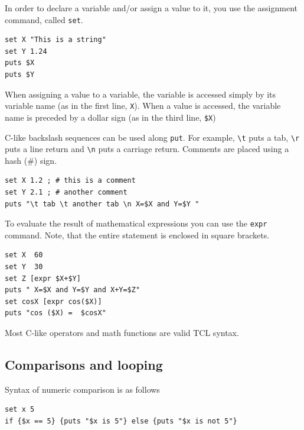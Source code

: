 \documentclass[
paper=a4,                       %
fontsize=11pt,                  %
twoside,                        %
footsepline,                    %
headsepline,                    %
headinclude=false,              %
footinclude=false,              %
pagesize,                       %
]{scrartcl}
\begin{document}
\noindent In order to declare a variable and/or assign a value to it, you use the
assignment command, called \lstinline|set|.

{\small\vspace{0,2cm}
\begin{lstlisting}[numbers=none]
set X "This is a string"
set Y 1.24
puts $X
puts $Y
\end{lstlisting}\vspace{0,2cm}
} 

\noindent When assigning a value to a variable, the variable is accessed simply by its
variable name (as in the first line, \texttt{X}). When a value is accessed, the variable
name is preceded by a dollar sign (as in the third line, \texttt{\$X})

\noindent C-like backslash sequences can be used along \lstinline|put|. For example,
\texttt{\textbackslash{}t} puts a tab, \texttt{\textbackslash{}r} puts a line return and \texttt{\textbackslash{}n} puts a carriage
return. Comments are placed using a hash (\#) sign.

{\small\vspace{0,2cm}
\begin{lstlisting}[numbers=none]
set X 1.2 ;	# this is a comment
set Y 2.1 ;	# another comment
puts "\t tab \t another tab \n X=$X and Y=$Y "
\end{lstlisting}\vspace{0,2cm}
} 

\noindent To evaluate the result of mathematical expressions you can use the 
\lstinline|expr| command. Note, that the entire statement is enclosed in square brackets. 

{\small\vspace{0,2cm}
\begin{lstlisting}[numbers=none]
set X  60
set Y  30
set Z [expr $X+$Y]
puts " X=$X and Y=$Y and X+Y=$Z"
set cosX [expr cos($X)]
puts "cos ($X) =  $cosX"
\end{lstlisting}\vspace{0,2cm}
}

\noindent Most C-like operators and math functions are valid TCL syntax.

\subsection{Comparisons and looping}

Syntax of numeric comparison is as follows 

{\small\vspace{0,2cm}
\begin{lstlisting}[numbers=none]
set x 5
if {$x == 5} {puts "$x is 5"} else {puts "$x is not 5"}
\end{lstlisting}\vspace{0,2cm}
} 
      
\end{document}
